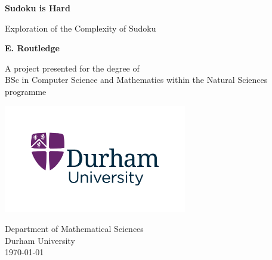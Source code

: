 \begin{titlepage}
   \begin{center}
       \vspace*{1cm}

	\Huge
       \textbf{Sudoku is Hard}

\LARGE
       \vspace{0.5cm}
        Exploration of the Complexity of Sudoku
            
       \vspace{1.5cm}

       \textbf{E. Routledge}

       \vfill
        \large    
       A project presented for the degree of\\
       BSc in Computer Science and Mathematics within the Natural Sciences programme
            
       \vspace{0.8cm}
     
       \includegraphics[width=0.6\textwidth]{DurhamUniversityMasterLogo_RGB.jpg}
            
       Department of Mathematical Sciences\\
       Durham University\\
\today
            
   \end{center}
\end{titlepage}